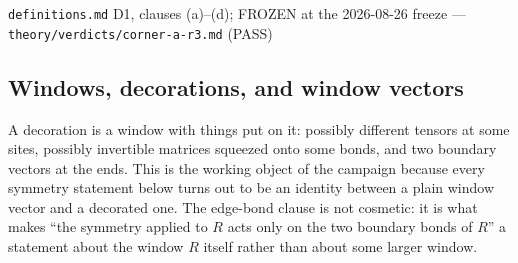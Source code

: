 %
{\texttt{definitions.md} D1, clauses (a)--(d); FROZEN at the 2026-08-26 freeze}%
{---}%
{\texttt{theory/verdicts/corner-a-r3.md} (PASS)}

\subsection{Windows, decorations, and window vectors}

A decoration is a window with things put on it: possibly different tensors at
some sites, possibly invertible matrices squeezed onto some bonds, and two
boundary vectors at the ends. This is the working object of the campaign
because every symmetry statement below turns out to be an identity between a
plain window vector and a decorated one. The edge-bond clause is not
cosmetic: it is what makes ``the symmetry applied to $R$ acts only on the two
boundary bonds of $R$'' a statement about the window $R$ itself rather than
about some larger window.

